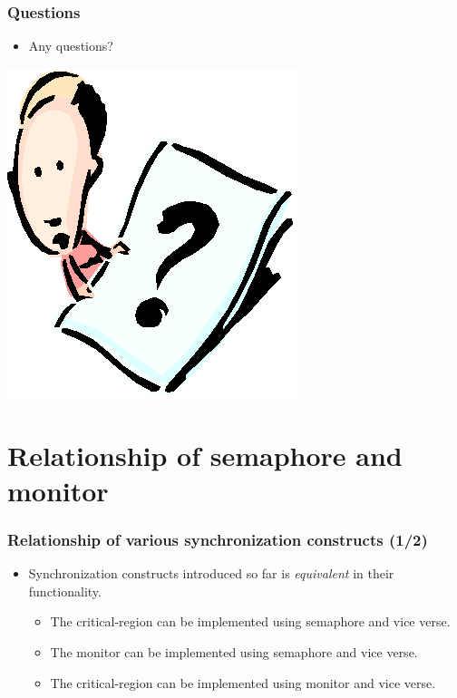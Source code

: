 \documentclass[CJKutf8,xcolor=pdftex,dvipsnames,table]{beamer}
\begin{document}
\begin{CJK*}{UTF8}{song}
  \begin{frame}
  \frametitle{Questions}
  \begin{itemize}
  \item{Any questions?}
  \end{itemize}
  \begin{center}
    \includegraphics[scale=.5]{question}
  \end{center}
  \end{frame}

\section{Relationship of semaphore and monitor}

\iffalse

  \begin{frame}
  \frametitle{Relationship of various synchronization constructs (1/2)} \pause
  \begin{itemize}
  \item{Synchronization constructs introduced so far is \emph{equivalent} in their functionality.} \pause
    \begin{itemize}
    \item{The critical-region can be implemented using semaphore and vice verse.} \pause
    \item{The monitor can be implemented using semaphore and vice verse.} \pause
    \item{The critical-region can be implemented using monitor and vice verse.}
    \end{itemize}
  \end{itemize}
  \end{frame}


\end{CJK*}
\end{document}
